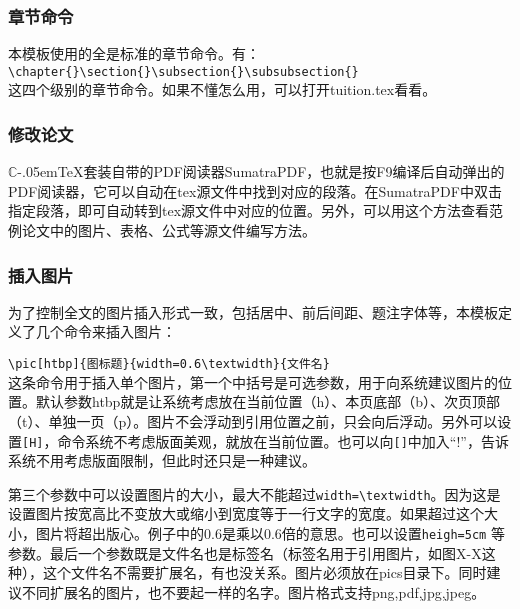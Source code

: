 \subsubsection{章节命令}
本模板使用的全是标准的章节命令。有：\\
\verb|\chapter{}\section{}\subsection{}\subsubsection{}|\\
这四个级别的章节命令。如果不懂怎么用，可以打开tuition.tex看看。

\subsubsection{修改论文}
$\mathbb{C}$\kern-.05em\TeX{}套装自带的PDF阅读器SumatraPDF，也就是按F9编译后自动弹出的PDF阅读器，它可以自动在tex源文件中找到对应的段落。在SumatraPDF中双击指定段落，即可自动转到tex源文件中对应的位置。另外，可以用这个方法查看范例论文中的图片、表格、公式等源文件编写方法。
\subsubsection{插入图片}
为了控制全文的图片插入形式一致，包括居中、前后间距、题注字体等，本模板定义了几个命令来插入图片：

\verb|\pic[htbp]{图标题}{width=0.6\textwidth}{文件名}|\\
这条命令用于插入单个图片，第一个中括号是可选参数，用于向系统建议图片的位置。默认参数htbp就是让系统考虑放在当前位置（h）、本页底部（b）、次页顶部（t）、单独一页（p）。图片不会浮动到引用位置之前，只会向后浮动。另外可以设置\verb|[H]|，命令系统不考虑版面美观，就放在当前位置。也可以向\verb|[]|中加入“!”，告诉系统不用考虑版面限制，但此时还只是一种建议。

第三个参数中可以设置图片的大小，最大不能超过\verb|width=\textwidth|。因为这是设置图片按宽高比不变放大或缩小到宽度等于一行文字的宽度。如果超过这个大小，图片将超出版心。例子中的0.6是乘以0.6倍的意思。也可以设置\verb|heigh=5cm| 等参数。最后一个参数既是文件名也是标签名（标签名用于引用图片，如图X-X这种），这个文件名不需要扩展名，有也没关系。图片必须放在pics目录下。同时建议不同扩展名的图片，也不要起一样的名字。图片格式支持png,pdf,jpg,jpeg。

